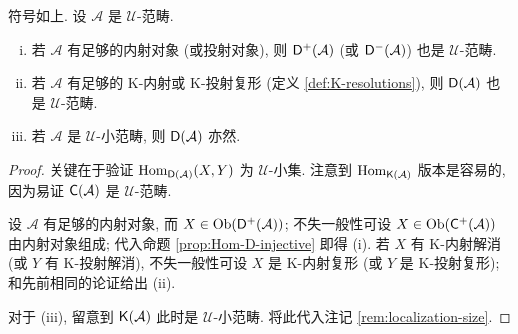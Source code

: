 \begin{corollary}\label{prop:D-size}
	符号如上. 设 $\mathcal{A}$ 是 $\mathcal{U}$-范畴.
	\begin{enumerate}[(i)]
		\item 若 $\mathcal{A}$ 有足够的内射对象 (或投射对象), 则 $\mathsf{D}^+(\mathcal{A})$ (或 $\mathsf{D}^-(\mathcal{A})$) 也是 $\mathcal{U}$-范畴.
		\item 若 $\mathcal{A}$ 有足够的 K-内射或 K-投射复形 (定义 \ref{def:K-resolutions}), 则 $\mathsf{D}(\mathcal{A})$ 也是 $\mathcal{U}$-范畴.
		\item 若 $\mathcal{A}$ 是 $\mathcal{U}$-小范畴, 则 $\mathsf{D}(\mathcal{A})$ 亦然.
	\end{enumerate}
\end{corollary}
\begin{proof}
	关键在于验证 $\operatorname{Hom}_{\mathsf{D}(\mathcal{A})}(X, Y)$ 为 $\mathcal{U}$-小集. 注意到 $\operatorname{Hom}_{\mathsf{K}(\mathcal{A})}$ 版本是容易的, 因为易证 $\mathsf{C}(\mathcal{A})$ 是 $\mathcal{U}$-范畴.

	设 $\mathcal{A}$ 有足够的内射对象, 而 $X \in \operatorname{Ob}(\mathsf{D}^+(\mathcal{A}))$; 不失一般性可设 $X \in \operatorname{Ob}(\mathsf{C}^+(\mathcal{A}))$ 由内射对象组成; 代入命题 \ref{prop:Hom-D-injective} 即得 (i). 若 $X$ 有 K-内射解消 (或 $Y$ 有 K-投射解消), 不失一般性可设 $X$ 是 K-内射复形 (或 $Y$ 是 K-投射复形); 和先前相同的论证给出 (ii).

	对于 (iii), 留意到 $\mathsf{K}(\mathcal{A})$ 此时是 $\mathcal{U}$-小范畴. 将此代入注记 \ref{rem:localization-size}.
\end{proof}

